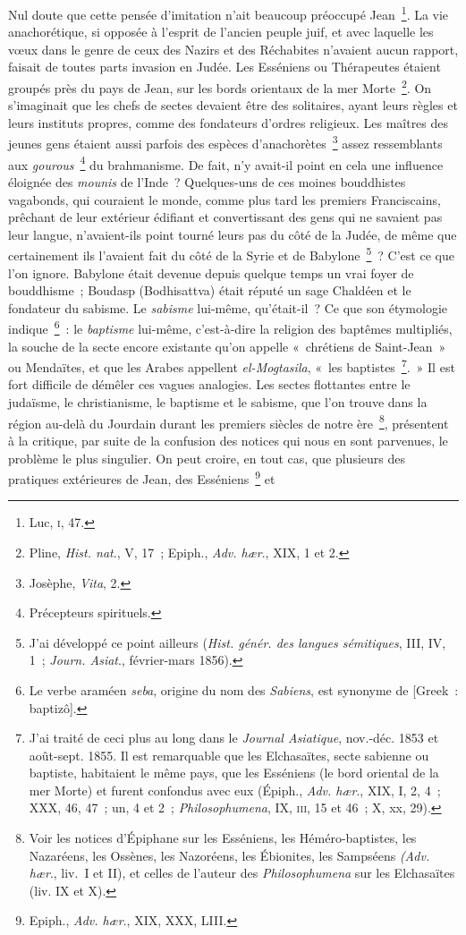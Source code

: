 \documentclass[french,twoside]{book} %
\begin{document}
Nul doute que cette pensée d’imitation n’ait beaucoup préoccupé Jean \footnote{ Luc, \textsc{i}, 47.}. La vie anachorétique, si opposée à l’esprit de l’ancien peuple juif, et avec laquelle les vœux dans le genre de ceux des Nazirs et des Réchabites n’avaient aucun rapport, faisait de toutes parts invasion en Judée. Les Esséniens ou Thérapeutes étaient groupés près du pays de Jean, sur les bords orientaux de la mer Morte \footnote{ Pline, {\itshape Hist. nat}., V, 17 ; Epiph., {\itshape Adv. hær}., XIX, 1 et 2.}. On s’imaginait que les chefs de sectes devaient être des solitaires, ayant leurs règles et leurs instituts propres, comme des fondateurs d’ordres religieux. Les maîtres des jeunes gens étaient aussi parfois des espèces d’anachorètes \footnote{ Josèphe, {\itshape Vita}, 2.} assez ressemblants aux {\itshape gourous} \footnote{Précepteurs spirituels.} du brahmanisme. De fait, n’y avait-il point en cela une influence éloignée des {\itshape mounis} de l’Inde ? Quelques-uns de ces moines bouddhistes vagabonds, qui couraient le monde, comme plus tard les premiers Franciscains, prêchant de leur extérieur édifiant et convertissant des gens qui ne savaient pas leur langue, n’avaient-ils point tourné leurs pas du côté de la Judée, de même que certainement ils l’avaient fait du côté de la Syrie et de Babylone \footnote{ J’ai développé ce point ailleurs ({\itshape Hist. génér. des langues sémitiques}, III, IV, 1 ; {\itshape Journ. Asiat}., février-mars 1856).} ? C’est ce que l’on ignore. Babylone était devenue depuis quelque temps un vrai foyer de bouddhisme ; Boudasp (Bodhisattva) était réputé un sage Chaldéen et le fondateur du sabisme. Le {\itshape sabisme} lui-même, qu’était-il ? Ce que son étymologie indique \footnote{ Le verbe araméen {\itshape seba}, origine du nom des {\itshape Sabiens}, est synonyme de [Greek : baptizô].} : le {\itshape baptisme} lui-même, c’est-à-dire la religion des baptêmes multipliés, la souche de la secte encore existante qu’on appelle « chrétiens de Saint-Jean » ou Mendaïtes, et que les Arabes appellent {\itshape el-Mogtasila}, « les baptistes \footnote{ J’ai traité de ceci plus au long dans le {\itshape Journal Asiatique}, nov.-déc. 1853 et août-sept. 1855. Il est remarquable que les Elchasaïtes, secte sabienne ou baptiste, habitaient le même pays, que les Esséniens (le bord oriental de la mer Morte) et furent confondus avec eux (Épiph., {\itshape Adv. hær}., XIX, I, 2, 4 ; XXX, 46, 47 ; un, 4 et 2 ; {\itshape Philosophumena}, IX, \textsc{iii}, 15 et 46 ; X, xx, 29).}. » Il est fort difficile de démêler ces vagues analogies. Les sectes flottantes entre le judaïsme, le christianisme, le baptisme et le sabisme, que l’on trouve dans la région au-delà du Jourdain durant les premiers siècles de notre ère \footnote{ Voir les notices d’Épiphane sur les Esséniens, les Héméro-baptistes, les Nazaréens, les Ossènes, les Nazoréens, les Ébionites, les Sampséens {\itshape (Adv. hær}., liv. I et II), et celles de l’auteur des {\itshape Philosophumena} sur les Elchasaïtes (liv. IX et X).}, présentent à la critique, par suite de la confusion des notices qui nous en sont parvenues, le problème le plus singulier. On peut croire, en tout cas, que plusieurs des pratiques extérieures de Jean, des Esséniens \footnote{ Epiph., {\itshape Adv. hær}., XIX, XXX, LIII.} et 
\end{document}
